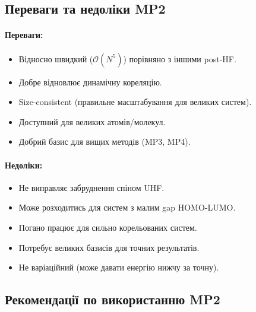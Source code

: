 \subsection{Переваги та недоліки MP2}



\paragraph{Переваги:}
\begin{itemize}
	\item Відносно швидкий ($\mathcal{O}(N^5)$) порівняно з іншими post-HF.
	\item Добре відновлює динамічну кореляцію.
	\item Size-consistent (правильне масштабування для великих систем).
	\item Доступний для великих атомів/молекул.
	\item Добрий базис для вищих методів (MP3, MP4).
\end{itemize}

\paragraph{Недоліки:}
\begin{itemize}
	\item Не виправляє забруднення спіном UHF.
	\item Може розходитись для систем з малим gap HOMO-LUMO.
	\item Погано працює для сильно корельованих систем.
	\item Потребує великих базисів для точних результатів.
	\item Не варіаційний (може давати енергію нижчу за точну).
\end{itemize}

\subsection{Рекомендації по використанню MP2}





